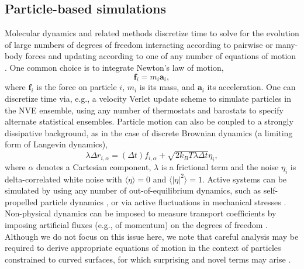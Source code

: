 \documentclass[preprint,12pt]{elsarticle}
\newcommand{\bs}[1]{\boldsymbol{#1}}
\begin{document}
\subsection{Particle-based simulations}
Molecular dynamics and related methods discretize time to solve for the evolution of large numbers of degrees of freedom interacting according to pairwise or many-body forces and updating according to one of any number of equations of motion \cite{frenkel2023understanding}. One common choice is to integrate Newton's law of motion, 
\begin{equation}\label{eq:basicupdate}
\bs{f}_i = m_i \bs{a}_i,
\end{equation}
where $\bs{f}_i$ is the force on particle $i$, $m_i$ is its mass, and $\bs{a}_i$ its acceleration. One can discretize time via, e.g., a velocity  Verlet update scheme to simulate particles in the NVE ensemble, using any number of thermostats and barostats to specify alternate statistical ensembles. Particle motion can also be coupled to a strongly dissipative background, as in the case of discrete Brownian dynamics (a limiting form of Langevin dynamics),
\begin{equation}
\lambda \Delta  r_{i,\alpha} = (\Delta t) f_{i,\alpha} + \sqrt{2 k_B T \lambda \Delta t }\eta_i,
\end{equation}
where $\alpha$ denotes a Cartesian component, $\lambda$  is a frictional term and the noise $\eta_i$ is delta-correlated white noise with $\langle\eta\rangle=0$ and $\langle \lvert\eta\rvert^2 \rangle = 1$. Active systems can be simulated by using any number of out-of-equilibrium  dynamics, such as self-propelled particle dynamics \cite{mishra2010fluctuations}, or via active fluctuations in mechanical stresses \cite{yamamoto2022non}. Non-physical dynamics can be imposed to measure transport coefficients by imposing artificial fluxes (e.g., of momentum) on the degrees of freedom \cite{muller1997simple}. 
Although we do not focus on this issue here, we note that careful analysis may be required to derive appropriate equations of motion in the context of particles constrained to curved surfaces, for which surprising and novel terms may arise \cite{nemeth2024intrinsic}.
\end{document}
